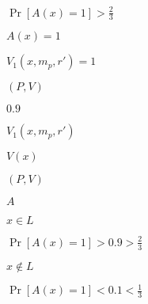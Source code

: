 \documentclass[10pt]{book}
\begin{document}
\begin{mdSnippets}
\begin{mdInlineSnippet}
$\Pr[A(x) = 1] > \frac{2}{3}$\end{mdInlineSnippet}%
\begin{mdInlineSnippet}[8d40d35d759ff395a9e63112f90d632e]%
$A(x) = 1$\end{mdInlineSnippet}%
\begin{mdInlineSnippet}[30b6719fa5a56e1601c97969995f1de5]%
$V_1(x,m_p,r') = 1$\end{mdInlineSnippet}%
\begin{mdInlineSnippet}[912e5c0903d34af49ea5488c8dfb2476]%
$(P,V)$\end{mdInlineSnippet}%
\begin{mdInlineSnippet}%
$0.9$\end{mdInlineSnippet}%
\begin{mdInlineSnippet}[5fc4f3ce96ff8fd76dab3d481c6c6285]%
$V_1(x,m_p,r')$\end{mdInlineSnippet}%
\begin{mdInlineSnippet}[7da3f9417e349bc472da3b128413cd70]%
$V(x)$\end{mdInlineSnippet}%
\begin{mdInlineSnippet}[912e5c0903d34af49ea5488c8dfb2476]%
$(P,V)$\end{mdInlineSnippet}%
\begin{mdInlineSnippet}[7fc56270e7a70fa81a5935b72eacbe29]%
$A$\end{mdInlineSnippet}%
\begin{mdInlineSnippet}[7788b409a9b3225cf8aecc6149a2bd2e]%
$x \in L$\end{mdInlineSnippet}%
\begin{mdInlineSnippet}%
$\Pr[A(x) = 1] > 0.9 > \frac{2}{3}$\end{mdInlineSnippet}%
\begin{mdInlineSnippet}[8e681b85e2ea0786a5bcdc939df91b34]%
$x \notin L$\end{mdInlineSnippet}%
\begin{mdInlineSnippet}%
$\Pr[A(x) = 1] < 0.1 < \frac{1}{3}$\end{mdInlineSnippet}%
\begin{mdInlineSnippet}%

\end{mdInlineSnippet}
\end{mdSnippets}
\end{document}
